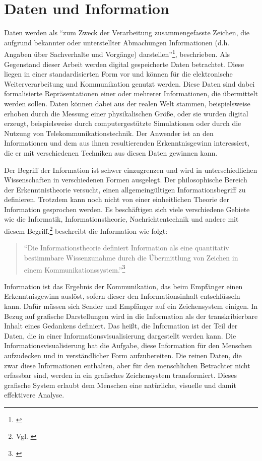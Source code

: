 \documentclass[a4paper, 
               12pt,
               DIV=calc,
               version=first,
               pdftex,
               headsepline,
               footsepline,
               bibtotocnumbered,
               liststotocnumbered]{scrreprt}
\begin{document}
\section{Daten und Information}
\label{sec:DatenInfo}
Daten werden als "`zum Zweck der Verarbeitung zusammengefasste Zeichen,
die aufgrund bekannter oder unterstellter Abmachungen
Informationen (d.h. Angaben über Sachverhalte und Vorgänge) darstellen"'\footnote{\citep{Gabler}}, beschrieben.
Als Gegenstand dieser Arbeit werden digital gespeicherte Daten betrachtet.
Diese liegen in einer standardisierten Form vor und können für die elektronische Weiterverarbeitung
und Kommunikation genutzt werden. Diese Daten sind dabei formalisierte Repräsentationen einer
oder mehrerer Informationen, die übermittelt werden sollen.
Daten können dabei aus der realen Welt stammen, beispielsweise erhoben durch
die Messung einer physikalischen Größe, oder sie wurden digital erzeugt, beispielsweise durch
computergestützte Simulationen oder durch die Nutzung von Telekommunikationstechnik.
Der Anwender ist an den Informationen und dem aus ihnen resultierenden Erkenntnisgewinn interessiert, die er mit verschiedenen
Techniken aus diesen Daten gewinnen kann.

Der Begriff der Information ist schwer einzugrenzen und wird in unterschiedlichen Wissenschaften
in verschiedenen Formen ausgelegt. Der philosophische Bereich der Erkenntnistheorie versucht,
einen allgemeingültigen Informationsbegriff zu definieren. Trotzdem kann noch nicht von einer
einheitlichen Theorie der Information gesprochen werden. Es beschäftigen sich viele verschiedene
Gebiete wie die Informatik, Informationstheorie, Nachrichtentechnik und andere mit diesem
Begriff.\footnote{Vgl. \citep{wiki_info}} \cite{Hoeher} beschreibt die Information wie folgt:
\begin{quote}
"`Die Informationstheorie definiert Information als eine quantitativ bestimmbare Wissenzunahme durch
die Übermittlung von Zeichen in einem Kommunikationssystem."'\footnote{\citep[S.\,3]{Hoeher}}
\end{quote}
Information ist das Ergebnis der Kommunikation, das beim Empfänger einen Erkenntnisgewinn auslöst,
sofern dieser den Informationsinhalt entschlüsseln kann. Dafür müssen sich Sender und Empfänger
auf ein Zeichensystem einigen.
In Bezug auf grafische Darstellungen wird in \cite{Bertin} die Information als der transkribierbare
Inhalt eines Gedankens definiert. Das heißt, die Information ist der Teil der Daten, die in einer
Informationsvisualisierung dargestellt werden kann. Die Informationsvisualisierung hat die
Aufgabe, diese Information für den Menschen aufzudecken und in verständlicher Form aufzubereiten.
Die reinen Daten, die zwar diese Informationen enthalten,
aber für den menschlichen Betrachter nicht erfassbar sind, werden in ein grafisches
Zeichensystem transformiert. Dieses grafische System erlaubt dem Menschen eine natürliche, visuelle und
damit effektivere Analyse.
\end{document}
